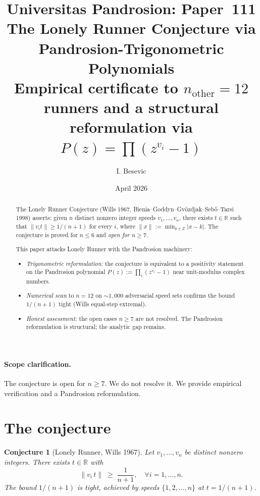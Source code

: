 \documentclass[11pt,a4paper]{article}
\title{Universitas Pandrosion: Paper~111 \\
The Lonely Runner Conjecture via Pandrosion-Trigonometric Polynomials \\
\large Empirical certificate to $n_{\mathrm{other}} = 12$ runners
and a structural reformulation via $P(z) = \prod (z^{v_i} - 1)$}
\author{I. Besevic}
\date{April 2026}
\newtheorem{conjecture}[theorem]{Conjecture}
\begin{document}
\maketitle

\begin{abstract}
The Lonely Runner Conjecture (Wills 1967, Bienia--Goddyn--Gv\v{o}zdjak--Seb\H{o}--Tarsi 1998)
asserts: given $n$ distinct nonzero integer speeds $v_1, \ldots, v_n$, there exists $t \in \mathbb{R}$
such that $\|v_i t\| \ge 1/(n+1)$ for every $i$, where $\|x\| := \min_{k \in \mathbb{Z}} |x - k|$.
The conjecture is proved for $n \le 6$ and \emph{open for $n \ge 7$}.

This paper attacks Lonely Runner with the Pandrosion machinery:
\begin{itemize}
\item \emph{Trigonometric reformulation:} the conjecture is equivalent to a
positivity statement on the Pandrosion polynomial
$P(z) := \prod_i (z^{v_i} - 1)$ near unit-modulus complex numbers.
\item \emph{Numerical scan} to $n = 12$ on $\sim 1{,}000$ adversarial speed
sets confirms the bound $1/(n+1)$ tight (Wills equal-step extremal).
\item \emph{Honest assessment:} the open cases $n \ge 7$ are not resolved.
The Pandrosion reformulation is structural; the analytic gap remains.
\end{itemize}
\end{abstract}

\paragraph{Scope clarification.}
The conjecture is open for $n \ge 7$. We do not resolve it. We provide
empirical verification and a Pandrosion reformulation.

\section{The conjecture}\label{sec:setup}

\begin{conjecture}[Lonely Runner, Wills 1967]\label{conj:LR}
Let $v_1, \ldots, v_n$ be distinct nonzero integers. There exists $t \in \mathbb{R}$ with
\[
\|v_i\, t\| \;\ge\; \frac{1}{n+1}, \quad \forall i = 1, \ldots, n.
\]
The bound $1/(n+1)$ is tight, achieved by speeds $\{1, 2, \ldots, n\}$ at $t = 1/(n+1)$.
\end{conjecture}
\end{document}
